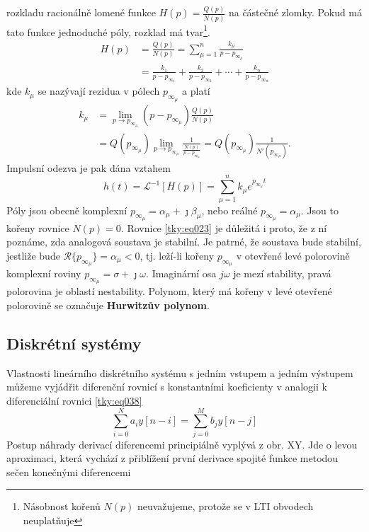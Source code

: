       rozkladu racionálně lomené funkce $H(p)=\frac{Q(p)}{N(p)}$ na částečné zlomky. Pokud má tato 
      funkce jednoduché póly, rozklad má tvar\footnote{Násobnost kořenů $N(p)$ neuvažujeme, protože 
      se v LTI obvodech neuplatňuje}.
      \begin{align}
         H(p)&=\frac{Q(p)}{N(p)} 
              =\sum_{\mu=1}^{n}\frac{k_\mu}{p-p_{\infty_\mu}}                  \nonumber \\
             &=\frac{k_1}{p-p_{\infty_1}}+\frac{k_2}{p-p_{\infty_2}}
               +\cdots+\frac{k_n}{p-p_{\infty_n}}                              \label{tky:eq004}
      \end{align}
      kde $k_\mu$ se nazývají rezidua v pólech $p_{\infty_\mu}$ a platí
      \begin{align}
        k_\mu &= \lim_{p\to p_{\infty_\mu}}(p-p_{\infty_\mu})\frac{Q(p)}{N(p)} \nonumber \\
        \,    &= Q(p_{\infty_\mu})\lim_{p\to
                 p_{\infty_\mu}}\frac{1}{\frac{N(p)}{p-p_{\infty_\mu}}}=
                 Q(p_{\infty_\mu})\frac{1}{N'(p_{\infty_\mu})}.                 \label{tky:eq006}
      \end{align}
      Impulsní odezva je pak dána vztahem
      \begin{equation}\label{tky:eq023}
        h(t)=\mathcal{L}^{-1}[H(p)]=\sum_{\mu=1}^nk_\mu e^{p_{\infty_\mu}t}
      \end{equation}
      Póly jsou obecně komplexní $p_{\infty_{\mu}}=\alpha_\mu+\jmath\beta_\mu$, nebo reálné
      $p_{\infty_{\mu}}=\alpha_\mu$. Jsou to kořeny rovnice $N(p)=0$. Rovnice \ref{tky:eq023} je
      důležitá i proto, že z ní poznáme, zda analogová soustava je stabilní. Je patrné, že soustava
      bude stabilní, jestliže bude $\mathcal{R}\{p_{\infty_{\mu}}\}=\alpha_\mu<0$, tj. leží-li
      kořeny $p_{\infty_{\mu}}$ v otevřené levé polorovině komplexní roviny
      $p_{\infty_{\mu}}=\sigma+\jmath\omega$. Imaginární osa $j\omega$ je mezí stability, pravá
      polorovina je oblastí nestability. Polynom, který má kořeny v levé otevřené polorovině se
      označuje \textbf{Hurwitzův polynom}.

      
    
    \subsection{Diskrétní systémy}\label{tky:IchIIsecIIIssecII}
      Vlastnosti lineárního diskrétního systému s jedním vstupem a jedním výstupem můžeme vyjádřit
      diferenční rovnicí s konstantními koeficienty v analogii k diferenciální rovnici
      \ref{tky:eq038}
      \begin{equation}\label{tky:eq048}
        \sum_{i=0}^N a_iy[n-i] = \sum_{j=0}^M b_jy[n-j]
      \end{equation}
      Postup náhrady derivací diferencemi principiálně vyplývá z obr. XY. Jde o levou aproximaci,
      která vychází z přiblížení první derivace spojité funkce metodou sečen konečnými diferencemi

